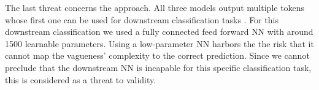 The last threat concerns the approach.
All three models output multiple tokens whose first one can be used for downstream classification tasks \parencite{Devlin:2018}.
For this downstream classification we used a fully connected feed forward \ac{NN} with around 1500 learnable parameters.
Using a low-parameter \ac{NN} harbors the the risk that it cannot map the vagueness' complexity to the correct prediction.
Since we cannot preclude that the downstream \ac{NN} is incapable for this specific classification task, this is considered as a threat to validity.
